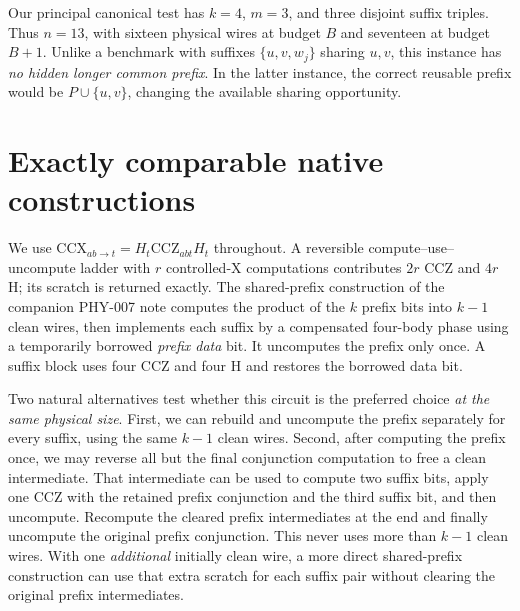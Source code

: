 \documentclass[11pt,a4paper]{article}
\begin{document}
Our principal canonical test has $k=4$, $m=3$, and three disjoint suffix triples. Thus $n=13$, with sixteen physical wires at budget $B$ and seventeen at budget $B+1$. Unlike a benchmark with suffixes $\{u,v,w_j\}$ sharing $u,v$, this instance has \emph{no hidden longer common prefix}. In the latter instance, the correct reusable prefix would be $P\cup\{u,v\}$, changing the available sharing opportunity.

\section{Exactly comparable native constructions}
We use $\mathrm{CCX}_{ab\to t}=H_t\mathrm{CCZ}_{abt}H_t$ throughout. A reversible compute--use--uncompute ladder with $r$ controlled-X computations contributes $2r$ CCZ and $4r$ H; its scratch is returned exactly. The shared-prefix construction of the companion PHY-007 note computes the product of the $k$ prefix bits into $k-1$ clean wires, then implements each suffix by a compensated four-body phase using a temporarily borrowed \emph{prefix data} bit. It uncomputes the prefix only once. A suffix block uses four CCZ and four H and restores the borrowed data bit.

Two natural alternatives test whether this circuit is the preferred choice \emph{at the same physical size}. First, we can rebuild and uncompute the prefix separately for every suffix, using the same $k-1$ clean wires. Second, after computing the prefix once, we may reverse all but the final conjunction computation to free a clean intermediate. That intermediate can be used to compute two suffix bits, apply one CCZ with the retained prefix conjunction and the third suffix bit, and then uncompute. Recompute the cleared prefix intermediates at the end and finally uncompute the original prefix conjunction. This never uses more than $k-1$ clean wires. With one \emph{additional} initially clean wire, a more direct shared-prefix construction can use that extra scratch for each suffix pair without clearing the original prefix intermediates.
\end{document}
